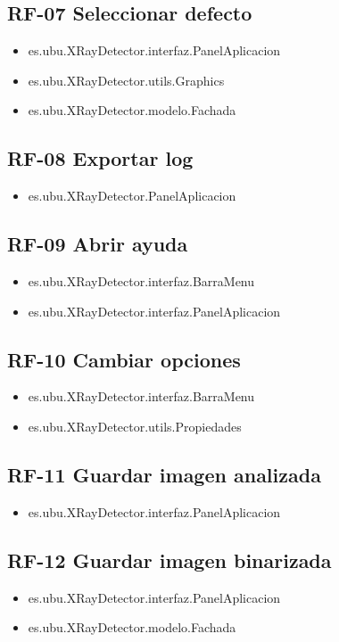 \subsection{RF-07 Seleccionar defecto}
\begin{itemize}
\item[] es.ubu.XRayDetector.interfaz.PanelAplicacion
\item[] es.ubu.XRayDetector.utils.Graphics
\item[] es.ubu.XRayDetector.modelo.Fachada
\end{itemize}

\subsection{RF-08 Exportar log}
\begin{itemize}
\item[] es.ubu.XRayDetector.PanelAplicacion
\end{itemize}

\subsection{RF-09 Abrir ayuda}
\begin{itemize}
\item[] es.ubu.XRayDetector.interfaz.BarraMenu
\item[] es.ubu.XRayDetector.interfaz.PanelAplicacion
\end{itemize}

\subsection{RF-10 Cambiar opciones}
\begin{itemize}
\item[] es.ubu.XRayDetector.interfaz.BarraMenu
\item[] es.ubu.XRayDetector.utils.Propiedades
\end{itemize}

\subsection{RF-11 Guardar imagen analizada}
\begin{itemize}
\item[] es.ubu.XRayDetector.interfaz.PanelAplicacion
\end{itemize}

\subsection{RF-12 Guardar imagen binarizada}
\begin{itemize}
\item[] es.ubu.XRayDetector.interfaz.PanelAplicacion
\item[] es.ubu.XRayDetector.modelo.Fachada
\end{itemize}

